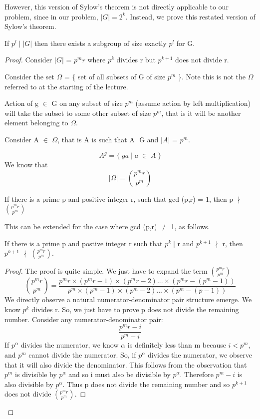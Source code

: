However, this version of Sylow's theorem is not directly applicable to our problem, since in our problem, $|G| = 2^{k}$. Instead, we prove this restated version of Sylow's theorem.

\begin{theorem}
If $p^{l} \; | \; |G|$ then there exists a subgroup of size exactly $p^{l}$ for G.
\end{theorem}

\begin{proof}

Consider $|G|$ = $p^{m}r$ where $p^{k}$ divides r but $p^{k+1}$ does not divide r.

Consider the set $\Omega$ = \{ set of all subsets of G of size $p^{m}$ \}. Note this is not the $\Omega$ referred to at the starting of the lecture.

Action of g $\in$ G on any subset of size $p^{m}$ (assume action by left multiplication) will take the subset to some other subset of size $p^{m}$, that is it will be another element belonging to $\Omega$.

Consider A $\in$ $\Omega$, that is A is such that A $ $ G and $|A|$ = $p^{m}$.

$$ A^{g} = \{\; ga\; | \; a\; \in \; A \;\} $$
We know that
$$ |\Omega| = {p^{m}r \choose p^{m}} $$

\begin{theorem}
If there is a prime p and positive integer r, such that gcd (p,r) = 1, then p $\nmid$ ${p^{m}r \choose p^{m}}$
\end{theorem}

This can be extended for the case where gcd (p,r) $\neq$ 1, as follows.
\begin{theorem}
If there is a prime p and postive integer r such that $p^{k} \;|$ r and $p^{k+1}$ $\nmid$ r, then $p^{k+1}$ $\nmid$ $p^{m}r \choose p^{m}$. 
\end{theorem}
\begin{proof}
The proof is quite simple. We just have to expand the term $p^{m}r \choose p^{m}$
\[  {p^{m}r \choose p^{m}} = \frac{p^{m}r \times (p^{m}r - 1) \times (p^{m}r - 2) ... \times (p^{m}r - (p^{m} - 1))}{p^{m} \times (p^{m} - 1) \times (p^{m} - 2) ... \times (p^{m} - (p - 1))} \]
We directly observe a natural numerator-denominator pair structure emerge. We know $p^{k}$ divides r. So, we just have to prove p does not divide the remaining number. Consider any numerator-denominator pair:
$$ \frac{p^{m}r - i}{p^{m} - i} $$
If $p^{\alpha}$ divides the numerator, we know $\alpha$ is definitely less than m because $i < p^{m}$, and $p^{m}$ cannot divide the numerator. So, if $p^{\alpha}$ divides the numerator, we observe that it will also divide the denominator. This follows from the observation that $p^{m}$ is divisible by $p^{\alpha}$ and so i must also be divisible by $p^{\alpha}$. Therefore $p^{m} - i$ is also divisible by $p^{\alpha}$. Thus p does not divide the remaining number and so $p^{k+1}$ does not divide $p^{m}r \choose p^{m}$. 
\end{proof}


\end{proof}
